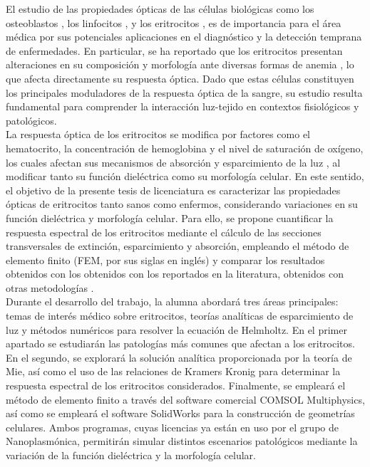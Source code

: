 \documentclass[11pt,letterpaper]{article}
\begin{document}
	El estudio de las propiedades ópticas de las células biológicas como los osteoblastos \cite{antunesOpticalPropertiesBone2019}, los linfocitos \cite{yoonIdentificationNonactivatedLymphocytes2017}, y los eritrocitos \cite{bosschaartLiteratureReviewNovel2014}, es de importancia para el área médica por sus potenciales aplicaciones en el diagnóstico y la detección temprana de enfermedades.  En particular, se ha reportado que los eritrocitos presentan alteraciones en su composición y morfología ante diversas formas de anemia \cite{bosschaartLiteratureReviewNovel2014}, lo que afecta directamente su respuesta óptica. Dado que estas células constituyen los principales moduladores de la respuesta óptica de la sangre, su estudio resulta fundamental para comprender la interacción luz-tejido en contextos fisiológicos y patológicos.\\
	
	La respuesta óptica de los eritrocitos se modifica por factores como el hematocrito, la concentración de hemoglobina y el nivel de saturación de oxígeno, los cuales afectan sus mecanismos de absorción y esparcimiento de la luz \cite{bosschaartLiteratureReviewNovel2014}, al modificar tanto su función dieléctrica como su morfología celular. En este sentido, el objetivo de la presente tesis de licenciatura es caracterizar las propiedades ópticas de eritrocitos tanto sanos como enfermos, considerando variaciones en su función dieléctrica y morfología celular. Para ello, se propone cuantificar la respuesta espectral de los eritrocitos mediante el cálculo de las secciones transversales de extinción, esparcimiento y absorción, empleando el método de elemento finito (FEM, por sus siglas en inglés) y comparar los resultados obtenidos con los obtenidos con los reportados en la literatura, obtenidos con otras metodologías \cite{ergulComputationalStudyScattering2010,wriedtLightScatteringSingle2006}.\\
	
	Durante el desarrollo del trabajo, la alumna abordará tres áreas principales: temas de interés médico sobre eritrocitos,  teorías analíticas de esparcimiento de luz y métodos numéricos para resolver la ecuación de Helmholtz. En el primer apartado se estudiarán las patologías más comunes que afectan a los eritrocitos. En el segundo, se explorará la solución analítica proporcionada por la teoría de Mie, así como el uso de las relaciones de Kramers Kronig \cite{lucariniKramersKronigRelationsOptical2005} para determinar la respuesta espectral de los eritrocitos considerados. Finalmente, se empleará el método de elemento finito a través del software comercial COMSOL Multiphysics, así como se empleará el software SolidWorks para la construcción de geometrías celulares. Ambos programas, cuyas licencias ya están en uso por el grupo de Nanoplasmónica, permitirán simular distintos escenarios patológicos mediante la variación de la función dieléctrica y la morfología celular.\\
	
\end{document}
